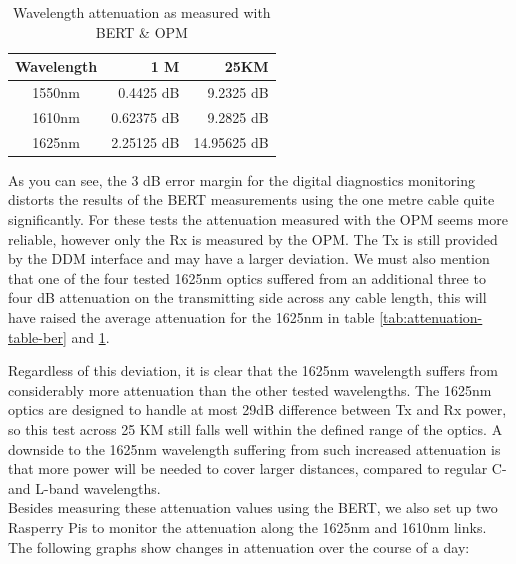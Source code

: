 \documentclass{article}
\begin{document}
\begin{table}[h]
\centering
\label{tab:attenuation-table-ofr}
\begin{tabular}{|c|r|r|}
\hline 
\textbf{Wavelength} & \textbf{1 M} & \textbf{25KM}\\ 
\hline 
1550nm & 0.4425 dB & 9.2325 dB\\ 
\hline 
1610nm & 0.62375 dB & 9.2825 dB\\ 
\hline 
1625nm & 2.25125 dB & 14.95625 dB\\
\hline
\end{tabular}
\caption{Wavelength attenuation as measured with BERT \& OPM}
\end{table}

As you can see, the 3 dB error margin for the digital diagnostics monitoring distorts the results of the BERT measurements using the one metre cable quite significantly.
For these tests the attenuation measured with the OPM seems more reliable, however only the Rx is measured by the OPM.
The Tx is still provided by the DDM interface and may have a larger deviation.
We must also mention that one of the four tested 1625nm optics suffered from an additional three to four dB attenuation on the transmitting side across any cable length, this will have raised the average attenuation for the 1625nm in table \ref{tab:attenuation-table-ber} and \ref{tab:attenuation-table-ofr}.

Regardless of this deviation, it is clear that the 1625nm wavelength suffers from considerably more attenuation than the other tested wavelengths.
The 1625nm optics are designed to handle at most 29dB difference between Tx and Rx power, so this test across 25 KM still falls well within the defined range of the optics.
A downside to the 1625nm wavelength suffering from such increased attenuation is that more power will be needed to cover larger distances, compared to regular C- and L-band wavelengths. \\

Besides measuring these attenuation values using the BERT, we also set up two Rasperry Pis to monitor the attenuation along the 1625nm and 1610nm links.
The following graphs show changes in attenuation over the course of a day:\\
\end{document}
